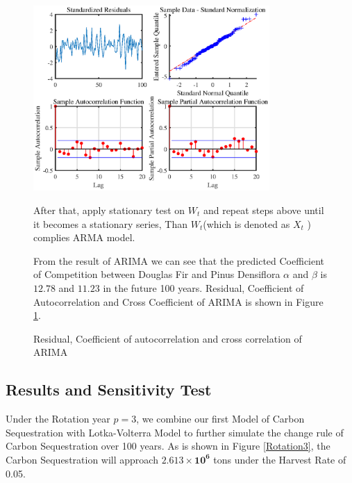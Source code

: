 \documentclass{mcmthesis}
\numberwithin{figure}{section}
\numberwithin{table}{section}
\numberwithin{equation}{section}
\begin{document}
\begin{figure}[ht]

  \hfill
  \begin{minipage}[htbp]{0.63\linewidth}
    \begin{flushleft}
      \includegraphics[width = 9cm]{code&pic/ARIMA残差&自相关互相关系数.eps}
      \caption{Residual, Coefficient of autocorrelation and cross correlation of ARIMA}\label{ARIMA Res}
    \end{flushleft}
  \end{minipage}
    \begin{minipage}[htbp]{0.34\linewidth}
      After that, apply stationary test on $ W_t $ and repeat steps above 
      until it becomes a stationary series, Than $ W_t $(which is denoted
      as $ X_t $ ) complies ARMA model. 
      \par
      From the result of ARIMA we can see that the predicted Coefficient of Competition
      between  Douglas Fir and Pinus Densiflora $ \alpha  $ and $ \beta $ is $ \bm{12.78} $  and $ \bm{11.23}$
      in the future 100 years. Residual, Coefficient of Autocorrelation and Cross Coefficient
      of ARIMA is shown in Figure \ref{ARIMA Res}.
  \end{minipage}
\end{figure}


\subsection{Results and Sensitivity Test }
Under the Rotation year $ p = 3 $, we combine our first Model of Carbon Sequestration
with Lotka-Volterra Model to further simulate the change rule of Carbon Sequestration 
over 100 years. As is shown in Figure \ref{Rotation3}, the Carbon Sequestration will
approach $ \bm{2.613\times 10^6} $ tons under the Harvest Rate of 0.05.
\end{document}
